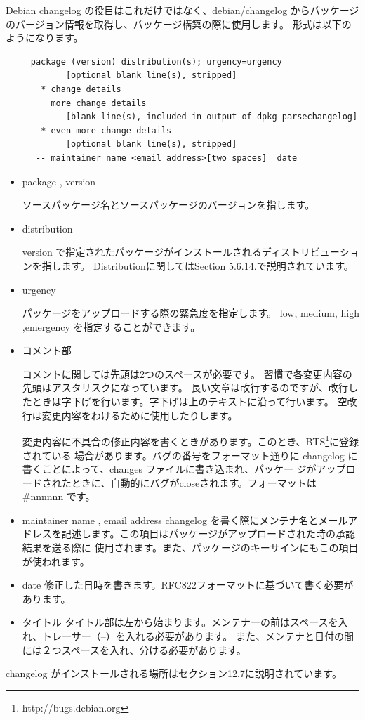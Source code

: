 \documentclass[mingoth,a4paper]{jsarticle}
\begin{document}
Debian changelog の役目はこれだけではなく、debian/changelog からパッケージのバージョン情報を取得し、パッケージ構築の際に使用します。
形式は以下のようになります。

\begin{verbatim}
     package (version) distribution(s); urgency=urgency
     	    [optional blank line(s), stripped]
       * change details
         more change details
     	    [blank line(s), included in output of dpkg-parsechangelog]
       * even more change details
     	    [optional blank line(s), stripped]
      -- maintainer name <email address>[two spaces]  date
\end{verbatim}

\begin{itemize}
\item package , version

 ソースパッケージ名とソースパッケージのバージョンを指します。
\item distribution
 
 version で指定されたパッケージがインストールされるディストリビューションを指します。
 Distributionに関してはSection 5.6.14.で説明されています。
\item urgency

 パッケージをアップロードする際の緊急度を指定します。
 low, medium, high ,emergency を指定することができます。
\item コメント部

 コメントに関しては先頭は2つのスペースが必要です。
 習慣で各変更内容の先頭はアスタリスクになっています。
 長い文章は改行するのですが、改行したときは字下げを行います。字下げは上のテキストに沿って行います。
 空改行は変更内容をわけるために使用したりします。

 変更内容に不具合の修正内容を書くときがあります。このとき、BTS\footnote{http://bugs.debian.org}に登録されている
 場合があります。バグの番号をフォーマット通りに changelog に書くことによって、changes ファイルに書き込まれ、パッケー
 ジがアップロードされたときに、自動的にバグがcloseされます。フォーマットは \#nnnnnn です。

\item maintainer name , email address
 changelog を書く際にメンテナ名とメールアドレスを記述します。この項目はパッケージがアップロードされた時の承認結果を送る際に
 使用されます。また、パッケージのキーサインにもこの項目が使われます。

\item date
 修正した日時を書きます。RFC822フォーマットに基づいて書く必要があります。


\item タイトル
 タイトル部は左から始まります。メンテナーの前はスペースを入れ、トレーサー（--）を入れる必要があります。
 また、メンテナと日付の間には２つスペースを入れ、分ける必要があります。

\end{itemize}
 changelog がインストールされる場所はセクション12.7に説明されています。
\end{document}
